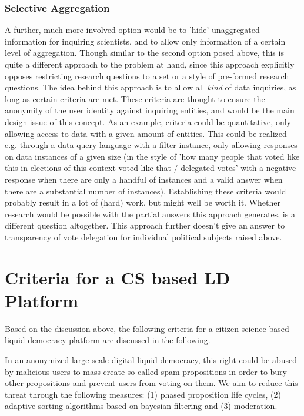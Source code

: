 \subsubsection{Selective Aggregation}

A further, much more involved option would be to 'hide' unaggregated information for inquiring scientists, and to allow only information of a certain level of aggregation. Though similar to the second option posed above, this is quite a different approach to the problem at hand, since this approach explicitly opposes restricting research questions to a set or a style of pre-formed research questions. The idea behind this approach is to allow all \textit{kind} of data inquiries, as long as certain criteria are met. These criteria are thought to ensure the anonymity of the user identity against inquiring entities, and would be the main design issue of this concept. As an example, criteria could be quantitative, only allowing access to data with a given amount of entities. This could be realized e.g. through a data query language with a filter instance, only allowing responses on data instances of a given size (in the style of 'how many people that voted like this in elections of this context voted like that / delegated votes' with a negative response when there are only a handful of instances and a valid answer when there are a substantial number of instances). Establishing these criteria would probably result in a lot of (hard) work, but might well be worth it. Whether research would be possible with the partial answers this approach generates, is a different question altogether. 
This approach further doesn't give an answer to transparency of vote delegation for individual political subjects raised above.

\section{Criteria for a CS based LD Platform}
\label{sec:Criteria}
Based on the discussion above, the following criteria for a citizen science based liquid democracy platform are discussed in the following.

In an anonymized large-scale digital liquid democracy, this right could be abused by malicious users to mass-create so called spam propositions in order to bury other propositions and prevent users from voting on them.
We aim to reduce this threat through the following measures: (1) phased proposition life cycles, (2) adaptive sorting algorithms based on bayesian filtering and (3) moderation.